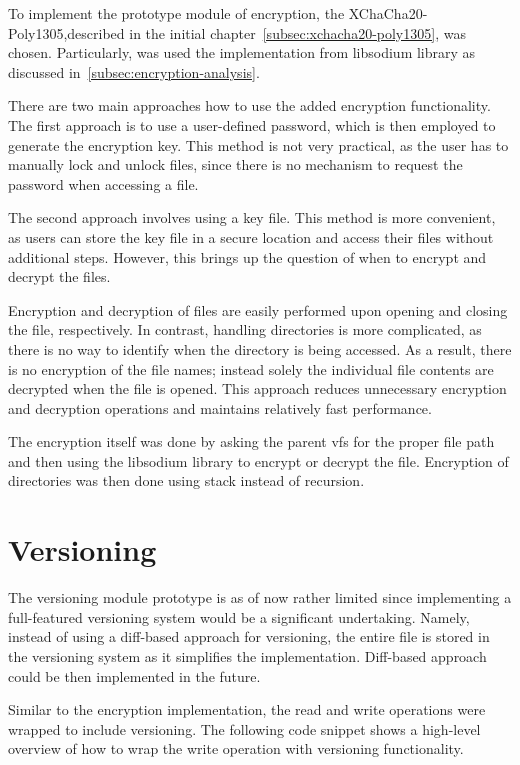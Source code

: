To implement the prototype module of encryption, the XChaCha20-Poly1305,described in the initial chapter~\ref{subsec:xchacha20-poly1305}, was chosen.
Particularly, was used the implementation from libsodium library as discussed in~\ref{subsec:encryption-analysis}.

There are two main approaches how to use the added encryption functionality.
The first approach is to use a user-defined password, which is then employed to generate the encryption key.
This method is not very practical, as the user has to manually lock and unlock files, since there is no mechanism to request the password when accessing a file.

The second approach involves using a key file.
This method is more convenient, as users can store the key file in a secure location and access their files without additional steps.
However, this brings up the question of when to encrypt and decrypt the files.

Encryption and decryption of files are easily performed upon opening and closing the file, respectively.
In contrast, handling directories is more complicated, as there is no way to identify when the directory is being accessed.
As a result, there is no encryption of the file names; instead solely the individual file contents are decrypted when the file is opened.
This approach reduces unnecessary encryption and decryption operations and maintains relatively fast performance.

The encryption itself was done by asking the parent vfs for the proper file path and then using the libsodium library to encrypt or decrypt the file.
Encryption of directories was then done using stack instead of recursion.


\section{Versioning}\label{sec:versioning2}

The versioning module prototype is as of now rather limited since implementing a full-featured versioning system would be a significant undertaking.
Namely, instead of using a diff-based approach for versioning, the entire file is stored in the versioning system as it simplifies the implementation.
Diff-based approach could be then implemented in the future.

Similar to the encryption implementation, the read and write operations were wrapped to include versioning.
The following code snippet shows a high-level overview of how to wrap the write operation with versioning functionality.


